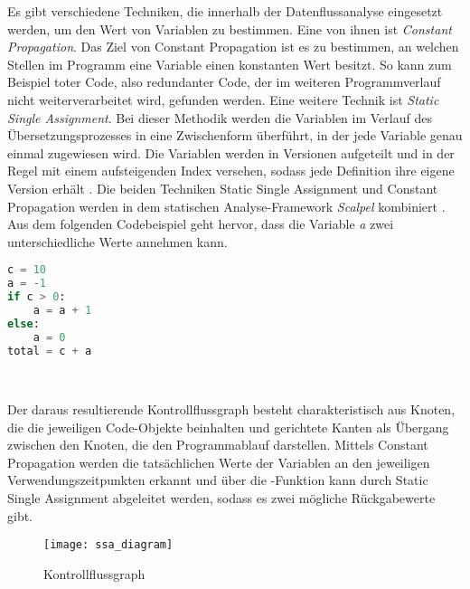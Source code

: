 \documentclass[german,bachelor]{swsLeipzig}
\begin{document}
\noindent Es gibt verschiedene Techniken, die innerhalb der Datenflussanalyse eingesetzt werden, um den Wert von Variablen zu bestimmen.
Eine von ihnen ist \textit{Constant Propagation}.
Das Ziel von Constant Propagation ist es zu bestimmen, an welchen Stellen im Programm eine Variable einen konstanten Wert besitzt.
So kann zum Beispiel toter Code, also redundanter Code, der im weiteren Programmverlauf nicht weiterverarbeitet wird, gefunden werden.
Eine weitere Technik ist \textit{Static Single Assignment}.
Bei dieser Methodik werden die Variablen im Verlauf des Übersetzungsprozesses in eine Zwischenform überführt, in der jede Variable
genau einmal zugewiesen wird.
Die Variablen werden in Versionen aufgeteilt und in der Regel mit einem aufsteigenden Index versehen,
sodass jede Definition ihre eigene Version erhält \cite[]{li2022scalpel}.
Die beiden Techniken Static Single Assignment und Constant Propagation werden in dem statischen Analyse-Framework
\textit{Scalpel} kombiniert \cite[]{li2022scalpel}. \\
\indent Aus dem folgenden Codebeispiel geht hervor, dass die Variable \textit{a} zwei unterschiedliche Werte annehmen kann.\\

\noindent\begin{minipage}{\linewidth}
\begin{lstlisting}[language=Python, frame=single, basicstyle=\small, caption={Codebeispiel von Scalpel für Datenflussanalyse {\cite[]{li2022scalpel}}},captionpos=b]
c = 10
a = -1
if c > 0:
    a = a + 1
else:
    a = 0
total = c + a
\end{lstlisting}
\end{minipage}
\

\noindent Der daraus resultierende Kontrollflussgraph besteht charakteristisch aus Knoten, die die jeweiligen Code-Objekte beinhalten und gerichtete Kanten als Übergang
zwischen den Knoten, die den Programmablauf darstellen.
Mittels Constant Propagation werden die tatsächlichen Werte der Variablen an den jeweiligen Verwendungszeitpunkten erkannt
und über die \textPhi-Funktion kann durch Static Single Assignment abgeleitet werden, sodass es zwei mögliche Rückgabewerte gibt.

\begin{figure}[h]
 \centering
 \texttt{[image: ssa\_diagram]}
 \caption{Kontrollflussgraph \cite[]{li2022scalpel}}
 \label{fig:scalpel}
\end{figure}
\end{document}
